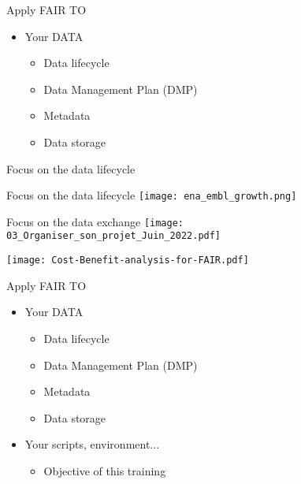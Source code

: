 \begin{frame}
\end{frame}

\begin{frame}
\begin{block}{Apply FAIR TO}
\begin{itemize}
\item Your DATA
	\begin{itemize}
	\item Data lifecycle
	\item Data Management Plan (DMP)
	\item Metadata
	\item Data storage
	\end{itemize}
\end{itemize}
\end{block}
\end{frame}

\begin{frame}{Focus on the data lifecycle}

\end{frame}

\begin{frame}{Focus on the data lifecycle}
\centering\texttt{[image: ena\_embl\_growth.png]}
\end{frame}

\begin{frame}{Focus on the data exchange}
\centering\texttt{[image: 03\_Organiser\_son\_projet\_Juin\_2022.pdf]}
\end{frame}

\begin{frame}
\centering\texttt{[image: Cost-Benefit-analysis-for-FAIR.pdf]}
\end{frame}

\begin{frame}
\begin{block}{Apply FAIR TO}
\begin{itemize}
\item Your DATA
	\begin{itemize}
	\item Data lifecycle
	\item Data Management Plan (DMP)
	\item Metadata
	\item Data storage
	\end{itemize}
\item Your scripts, environment...
	\begin{itemize}
	\item Objective of this training
	\end{itemize}
\end{itemize}
\end{block}
\end{frame}


